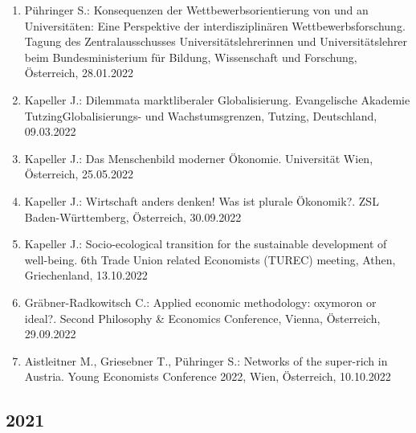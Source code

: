 \begin{enumerate}
	\item Pühringer S.: Konsequenzen der Wettbewerbsorientierung von und an Universitäten: Eine Perspektive der interdisziplinären Wettbewerbsforschung. Tagung des Zentralausschusses Universitätslehrerinnen und Universitätslehrer beim Bundesministerium für Bildung, Wissenschaft und Forschung, Österreich, 28.01.2022
	\item Kapeller J.: Dilemmata marktliberaler Globalisierung. Evangelische Akademie TutzingGlobalisierungs- und Wachstumsgrenzen, Tutzing, Deutschland, 09.03.2022
	\item Kapeller J.: Das Menschenbild moderner Ökonomie. Universität Wien, Österreich, 25.05.2022
	\item Kapeller J.: Wirtschaft anders denken! Was ist plurale Ökonomik?. ZSL Baden-Württemberg, Österreich, 30.09.2022
	\item Kapeller J.: Socio-ecological transition for the sustainable development of well-being. 6th Trade Union related Economists (TUREC) meeting, Athen, Griechenland, 13.10.2022
	\item Gräbner-Radkowitsch C.: Applied economic methodology: oxymoron or ideal?. Second Philosophy \& Economics Conference, Vienna, Österreich, 29.09.2022
	\item Aistleitner M., Griesebner T., Pühringer S.: Networks of the super-rich in Austria. Young Economists Conference 2022, Wien, Österreich, 10.10.2022
\end{enumerate}
\subsection*{2021}

